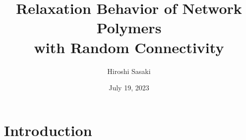 \documentclass[12pt, dvipdfmx]{beamer}
\title
[Relaxation Behavior of Network Polymers with Random Connectivity]
{Relaxation Behavior of Network Polymers\\ with Random Connectivity}
\author[Toagosei H.Sasaki]{Hiroshi Sasaki}
\institute[Toagosei Co., Ltd.]{Toagosei Co., Ltd.}
\date{July 19, 2023}
\begin{document}
\setlength{\abovedisplayskip}{2pt} %
\setlength{\belowdisplayskip}{2pt} %

\begin{frame}[noframenumbering]\frametitle{}
	\titlepage
\end{frame}

\section{Introduction}
\end{document}
